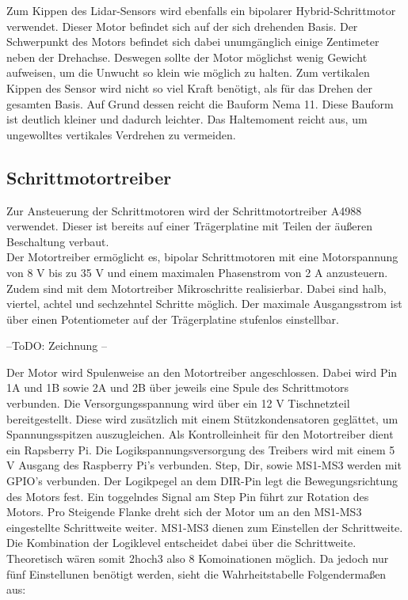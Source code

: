 Zum Kippen des Lidar-Sensors wird ebenfalls ein bipolarer Hybrid-Schrittmotor verwendet. Dieser Motor befindet sich auf der sich drehenden Basis. Der Schwerpunkt des Motors befindet sich dabei unumgänglich einige Zentimeter neben der Drehachse. Deswegen sollte der Motor möglichst wenig Gewicht aufweisen, um die Unwucht so klein wie möglich zu halten.
Zum vertikalen Kippen des Sensor wird nicht so viel Kraft benötigt, als für das Drehen der gesamten Basis. Auf Grund dessen reicht die Bauform Nema 11. Diese Bauform ist deutlich kleiner und dadurch leichter.
Das Haltemoment reicht aus, um ungewolltes vertikales Verdrehen zu vermeiden.


\subsection{Schrittmotortreiber}
Zur Ansteuerung der Schrittmotoren wird der Schrittmotortreiber A4988 verwendet. Dieser ist bereits auf einer Trägerplatine mit Teilen der äußeren Beschaltung verbaut.\\
Der Motortreiber ermöglicht es, bipolar Schrittmotoren mit eine Motorspannung von 8 V bis zu 35 V und einem maximalen Phasenstrom von 2 A anzusteuern.
Zudem sind mit dem Motortreiber Mikroschritte realisierbar. Dabei sind halb, viertel, achtel und sechzehntel Schritte möglich. Der maximale Ausgangsstrom ist über einen Potentiometer auf der Trägerplatine stufenlos einstellbar. 

--ToDO: Zeichnung --



Der Motor wird Spulenweise an den Motortreiber angeschlossen. Dabei wird Pin 1A und 1B sowie 2A und 2B über jeweils eine Spule des Schrittmotors verbunden.
Die Versorgungsspannung wird über ein 12 V Tischnetzteil bereitgestellt. Diese wird zusätzlich mit einem Stützkondensatoren geglättet, um Spannungsspitzen auszugleichen.
Als Kontrolleinheit für den Motortreiber dient ein Rapsberry Pi. Die Logikspannungsversorgung des Treibers wird mit einem 5 V Ausgang des Raspberry Pi’s verbunden.
Step, Dir, sowie MS1-MS3 werden mit GPIO’s verbunden. Der Logikpegel an dem DIR-Pin legt die Bewegungsrichtung des Motors fest. Ein toggelndes Signal am Step Pin führt zur Rotation des Motors. Pro Steigende Flanke dreht sich der Motor um an den MS1-MS3 eingestellte Schrittweite weiter. 
MS1-MS3 dienen zum Einstellen der Schrittweite. Die Kombination der Logiklevel entscheidet dabei über die Schrittweite. Theoretisch wären somit 2hoch3 also 8 Komoinationen möglich. Da jedoch nur fünf Einstellunen benötigt werden, sieht die Wahrheitstabelle Folgendermaßen aus:

